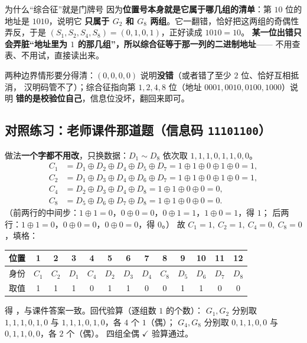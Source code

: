 \documentclass[11pt,a4paper]{ctexart}
\begin{document}
\begin{idea}{为什么“综合征”就是门牌号}
因为\textbf{位置号本身就是它属于哪几组的清单}：第 $10$ 位的地址是 $1010$，说明它
\textbf{只属于 $G_2$ 和 $G_8$ 两组}。它一翻错，恰好把这两组的奇偶性弄反，于是
$(S_1,S_2,S_4,S_8)=(0,1,0,1)$，正好读成 $1010=10$。
\textbf{某一位出错只会弄脏“地址里为 $1$ 的那几组”，所以综合征等于那一列的二进制地址}——
不用查表、不用试，直接读出来。

两种边界情形要分得清：$(0,0,0,0)$ 说明\textbf{没错}（或者错了至少 $2$ 位、恰好互相抵消，
汉明码管不了）；综合征指向第 $1,2,4,8$ 位（地址 $0001,0010,0100,1000$）说明
\textbf{错的是校验位自己}，信息位没坏，翻回来即可。
\end{idea}

\subsection{对照练习：老师课件那道题（信息码 \texttt{11101100}）}

做法\textbf{一个字都不用改}，只换数据：$D_1\sim D_8$ 依次取 $1,1,1,0,1,1,0,0$。
\begin{align*}
C_1&=D_1\oplus D_2\oplus D_4\oplus D_5\oplus D_7=1\oplus1\oplus0\oplus1\oplus0=1,\\
C_2&=D_1\oplus D_3\oplus D_4\oplus D_6\oplus D_7=1\oplus1\oplus0\oplus1\oplus0=1,\\
C_4&=D_2\oplus D_3\oplus D_4\oplus D_8=1\oplus1\oplus0\oplus0=0,\\
C_8&=D_5\oplus D_6\oplus D_7\oplus D_8=1\oplus1\oplus0\oplus0=0 .
\end{align*}
（前两行的中间步：$1\oplus1=0$，$0\oplus0=0$，$0\oplus1=1$，$1\oplus0=1$，得 $1$；
后两行：$1\oplus1=0$，$0\oplus0=0$，$0\oplus0=0$，得 $0$。）
故 $C_1=1,\ C_2=1,\ C_4=0,\ C_8=0$，填格：

\begin{center}\small
\setlength{\tabcolsep}{4pt}
\begin{tabular}{@{}l*{12}{c}@{}}
\toprule
位置 & 1&2&3&4&5&6&7&8&9&10&11&12\\
\midrule
身份 & $C_1$&$C_2$&$D_1$&$C_4$&$D_2$&$D_3$&$D_4$&$C_8$&$D_5$&$D_6$&$D_7$&$D_8$\\
取值 & 1&1&1&0&1&1&0&0&1&1&0&0\\
\bottomrule
\end{tabular}
\end{center}

得 ，与课件答案一致。回代验算（逐组数 $1$ 的个数）：
$G_1,G_2$ 分别取 $1,1,1,0,1,0$ 与 $1,1,1,0,1,0$，各 $4$ 个 $1$（偶）；
$G_4,G_8$ 分别取 $0,1,1,0,0$ 与 $0,1,1,0,0$，各 $2$ 个（偶）。
四组全偶 $\checkmark$ 验算通过。
\end{document}
